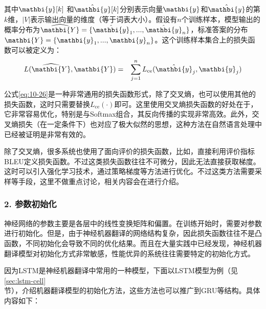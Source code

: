 \noindent 其中$\mathbi{y}[k]$ 和$\hat{\mathbi{y}}[k]$分别表示向量$\mathbi{y}$和$\hat{\mathbi{y}}$的第$k$维，$|V|$表示输出向量的维度（等于词表大小）。假设有$n$个训练样本，模型输出的概率分布为$\widehat{\mathbi{Y}}=\{ \hat{\mathbi{y}}_1,...,\hat{\mathbi{y}}_n \}$，标准答案的分布$\mathbi{Y} = \{ \mathbi{y}_1,..., \mathbi{y}_n \}$。这个训练样本集合上的损失函数可以被定义为：
\begin{eqnarray}
L(\widehat{\mathbi{Y}},\mathbi{Y}) &=& \sum_{j=1}^n L_{\textrm{ce}}(\hat{\mathbi{y}}_j,\mathbi{y}_j)
\label{eq:10-26}
\end{eqnarray}

\parinterval 公式\eqref{eq:10-26}是一种非常通用的损失函数形式，除了交叉熵，也可以使用其他的损失函数，这时只需要替换$L_{\textrm{ce}} (\cdot)$即可。这里使用交叉熵损失函数的好处在于，它非常容易优化，特别是与Softmax组合，其反向传播的实现非常高效。此外，交叉熵损失（在一定条件下）也对应了极大似然的思想，这种方法在自然语言处理中已经被证明是非常有效的。

\parinterval 除了交叉熵，很多系统也使用了面向评价的损失函数，比如，直接利用评价指标BLEU定义损失函数。不过这类损失函数往往不可微分，因此无法直接获取梯度。这时可以引入强化学习技术，通过策略梯度等方法进行优化。不过这类方法需要采样等手段，这里不做重点讨论，相关内容会在{\chapterthirteen}进行介绍。


\subsubsection{2. 参数初始化}

\parinterval 神经网络的参数主要是各层中的线性变换矩阵和偏置。在训练开始时，需要对参数进行初始化。但是，由于神经机器翻译的网络结构复杂，因此损失函数往往不是凸函数，不同初始化会导致不同的优化结果。而且在大量实践中已经发现，神经机器翻译模型对初始化方式非常敏感，性能优异的系统往往需要特定的初始化方式。

\parinterval 因为LSTM是神经机器翻译中常用的一种模型，下面以LSTM模型为例（见\ref{sec:lstm-cell}\\ 节），介绍机器翻译模型的初始化方法，这些方法也可以推广到GRU等结构。具体内容如下：

